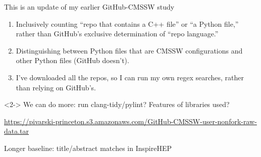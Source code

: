 \documentclass[aspectratio=169]{beamer}
\begin{document}
\begin{frame}{This is an update of my earlier GitHub-CMSSW study}
\vspace{0.5 cm}
\large

\begin{enumerate}\setlength{\itemsep}{0.35 cm}
\item Inclusively counting ``repo that contains a C++ file'' or ``a Python file,'' rather than GitHub's exclusive determination of ``repo language.''

\item Distinguishing between Python files that are CMSSW configurations and other Python files (GitHub doesn't).

\item I've downloaded all the repos, so I can run my own regex searches, rather than relying on GitHub's.
\end{enumerate}

\vspace{0.5 cm}
\begin{uncoverenv}<2->
We can do more: run clang-tidy/pylint? Features of libraries used?

\textcolor{blue}{\scriptsize\url{https://pivarski-princeton.s3.amazonaws.com/GitHub-CMSSW-user-nonfork-raw-data.tar}}
\end{uncoverenv}
\end{frame}

\begin{frame}{Longer baseline: title/abstract matches in InspireHEP}



\end{frame}
\end{document}
